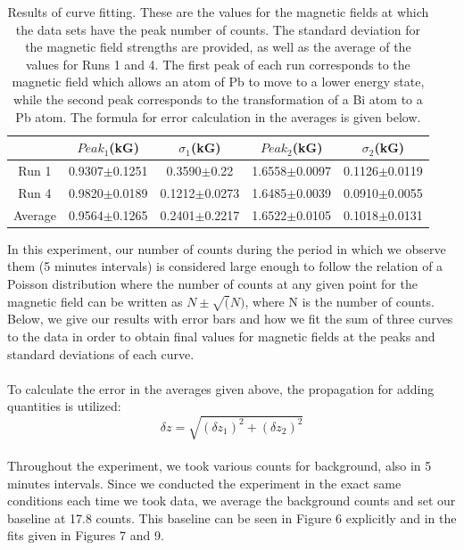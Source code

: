 \begin{table}[H]
\begin{center}
\begin{tabular}{|c|c|c|c|c|}\hline
&$Peak_1$(kG) &$\sigma_1$(kG)&$Peak_2$(kG) &$\sigma_2$(kG)  \\ \hline
Run 1 &0.9307$\pm$0.1251 & 0.3590$\pm$0.22 & 1.6558$\pm$0.0097 &0.1126$\pm$0.0119 \\ \hline
Run 4 &0.9820$\pm$0.0189 &0.1212$\pm$0.0273 &1.6485$\pm$0.0039 &0.0910$\pm$0.0055\\ \hline
Average &0.9564$\pm$0.1265 &0.2401$\pm$0.2217 &1.6522$\pm$0.0105 &0.1018$\pm$0.0131 \\ \hline
\end{tabular}
\caption{Results of curve fitting. These are the values for the magnetic fields at which the data sets have the peak number of counts. The standard deviation for the magnetic field strengths are provided, as well as the average of the values for Runs 1 and 4. The first peak of each run corresponds to the magnetic field which allows an atom of Pb to move to a lower energy state, while the second peak corresponds to the transformation of a Bi atom to a Pb atom. The formula for error calculation in the averages is given below.}
\end{center}
\end{table}
In this experiment, our number of counts during the period in which we observe them (5 minutes intervals) is considered large enough to follow the relation of a Poisson distribution where the number of counts at any given point for the magnetic field can be written as $N\pm \sqrt(N)$, where N is the number of counts. Below, we give our results with error bars and how we fit the sum of three curves to the data in order to obtain final values for magnetic fields at the peaks and standard deviations of each curve. \\ \\
To calculate the error in the averages given above, the propagation for adding quantities is utilized:
\begin{equation} \delta z=\sqrt{(\delta z_1)^2 + (\delta z_2)^2} \end {equation}
\\
Throughout the experiment, we took various counts for background, also in 5 minutes intervals. Since we conducted the experiment in the exact same conditions each time we took data, we average the background counts and set our baseline at 17.8 counts. This baseline can be seen in Figure 6 explicitly and in the fits given in Figures 7 and 9. 


